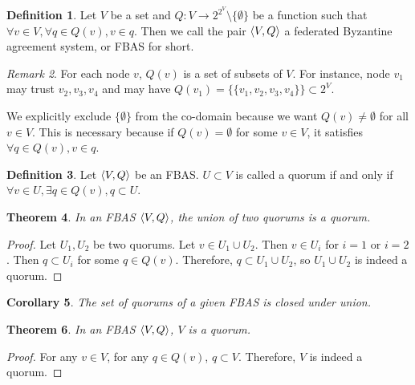 \documentclass[12pt, psamsfonts]{amsart}
\newtheorem{thm}{Theorem}[section]
\newtheorem{cor}[thm]{Corollary}
\theoremstyle{definition}
\newtheorem{defn}[thm]{Definition}
\theoremstyle{remark}
\newtheorem{rem}[thm]{Remark}
\numberwithin{equation}{section}
\begin{document}
\begin{defn}
    Let $V$ be a set and $Q:V \rightarrow 2^{2^V} \setminus \{ \emptyset \}$ be a function such that $\forall v \in V, \forall q \in Q(v), v \in q$.
    Then we call the pair $\ev{V, Q}$ a federated Byzantine agreement system, or FBAS for short.
\end{defn}

\begin{rem}
    For each node $v$, $Q(v)$ is a set of subsets of $V$.
    For instance, node $v_1$ may trust $v_2, v_3, v_4$ and may have $Q(v_1) = \{ \{ v_1, v_2, v_3, v_4 \} \} \subset 2^V$.

    We explicitly exclude $\{ \emptyset \}$ from the co-domain because we want $Q(v) \ne \emptyset$ for all $v \in V$.
    This is necessary because if $Q(v) = \emptyset$ for some $v \in V$, it satisfies $\forall q \in Q(v), v \in q$.
\end{rem}

\begin{defn}
    Let $\ev{V, Q}$ be an FBAS\@.
    $U \subset V$ is called a quorum if and only if $\forall v \in U, \exists q \in Q(v), q \subset U$.
\end{defn}

\begin{thm}\label{union_quorums}
    In an FBAS $\ev{V, Q}$, the union of two quorums is a quorum.
\end{thm}

\begin{proof}
    Let $U_1, U_2$ be two quorums.
    Let $v \in U_1 \cup U_2$.
    Then $v \in U_i$ for $i = 1$ or $i = 2$.
    Then $q \subset U_i$ for some $q \in Q(v)$.
    Therefore, $q \subset U_1 \cup U_2$, so $U_1 \cup U_2$ is indeed a quorum.
\end{proof}

\begin{cor}
    The set of quorums of a given FBAS is closed under union.
\end{cor}

\begin{thm}
    In an FBAS $\ev{V, Q}$, $V$ is a quorum.
\end{thm}

\begin{proof}
    For any $v \in V$, for any $q \in Q(v)$, $q \subset V$.
    Therefore, $V$ is indeed a quorum.
\end{proof}
\end{document}
